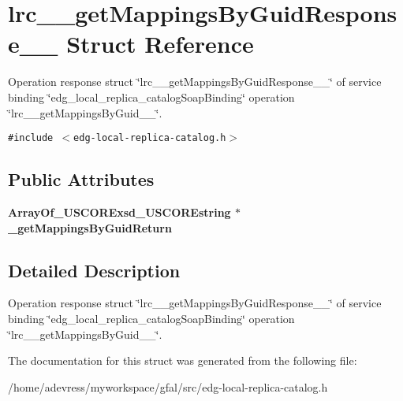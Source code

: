 \section{lrc\_\-\_\-get\-Mappings\-By\-Guid\-Response\_\-\_\- Struct Reference}
\label{structlrc____getMappingsByGuidResponse____}
Operation response struct \char`\"{}lrc\_\-\_\-get\-Mappings\-By\-Guid\-Response\_\-\_\-\char`\"{} of service binding \char`\"{}edg\_\-local\_\-replica\_\-catalog\-Soap\-Binding\char`\"{} operation \char`\"{}lrc\_\-\_\-get\-Mappings\-By\-Guid\_\-\_\-\char`\"{}.  


{\tt \#include $<$edg-local-replica-catalog.h$>$}

\subsection*{Public Attributes}
\begin{CompactItemize}
\item 
\bf{Array\-Of\_\-USCORExsd\_\-USCOREstring} $\ast$ \textbf{\_\-get\-Mappings\-By\-Guid\-Return}\label{structlrc____getMappingsByGuidResponse_____ba934ac21051148e9be7793af9593e1c}

\end{CompactItemize}


\subsection{Detailed Description}
Operation response struct \char`\"{}lrc\_\-\_\-get\-Mappings\-By\-Guid\-Response\_\-\_\-\char`\"{} of service binding \char`\"{}edg\_\-local\_\-replica\_\-catalog\-Soap\-Binding\char`\"{} operation \char`\"{}lrc\_\-\_\-get\-Mappings\-By\-Guid\_\-\_\-\char`\"{}. 



The documentation for this struct was generated from the following file:\begin{CompactItemize}
\item 
/home/adevress/myworkspace/gfal/src/edg-local-replica-catalog.h\end{CompactItemize}

